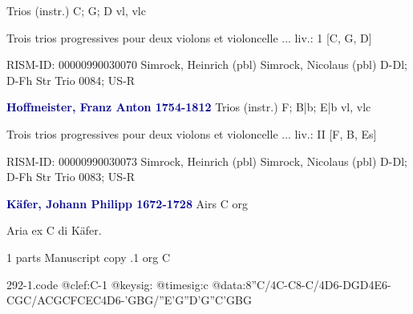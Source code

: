 \documentclass[twocolumn]{book}
\begin{document}
\newline Trios (instr.)  C; G; D  
 vl, vlc
\newline \begin{itshape}Trois trios progressives pour deux violons et violoncelle ... liv.: 1 [C, G, D]\end{itshape} 
\newline RISM-ID: 00000990030070
\newline Simrock, Heinrich  (pbl)
\newline Simrock, Nicolaus  (pbl)
\newline D-Dl; D-Fh  Str Trio 0084; US-R
\newline \par \vspace{7pt} \textcolor{darkblue}{\textbf{Hoffmeister, Franz Anton  1754-1812}}
\newline Trios (instr.)  F; B|b; E|b  
 vl, vlc
\newline \begin{itshape}Trois trios progressives pour deux violons et violoncelle ... liv.: II [F, B, Es]\end{itshape} 
\newline RISM-ID: 00000990030073
\newline Simrock, Heinrich  (pbl)
\newline Simrock, Nicolaus  (pbl)
\newline D-Dl; D-Fh  Str Trio 0083; US-R
\newline \par \vspace{7pt} \textcolor{darkblue}{\textbf{Käfer, Johann Philipp  1672-1728}}
\newline Airs  C  
\newline org
\newline \begin{itshape}[f.114v, heading:] Aria ex C di Käfer.\end{itshape} 
\newline \textcolor{darkblue}{}  1 parts  
\newline Manuscript copy
.1  org  C  
\begin{filecontents*}{292-1.code}
@clef:C-1
@keysig:
@timesig:c
@data:8''C/4C-C8-C/4D6-{DGD}4E6-{CGC}/{ACGC}{FCEC}4D6-{'GBG}/{''E'G''D'G}{''C'GBG}
\end{filecontents*}
\newline
%
\end{document}
